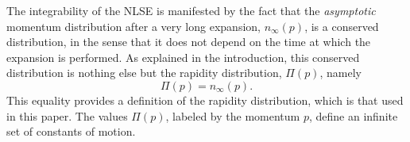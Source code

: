 \documentclass[submission,Phys,10pt]{SciPost}%
\begin{document}
The integrability of the NLSE is manifested
by the fact that the {\it asymptotic} momentum distribution after a very long expansion, $n_\infty(p)$, is a conserved distribution, in
the sense that it does not depend on the time at which the expansion is performed. As explained in the introduction, this conserved distribution is nothing else but the rapidity distribution,  $\Pi(p)$, namely
\begin{equation}
    \Pi(p)=n_\infty(p).
\end{equation}
This equality provides a definition of the rapidity distribution, which is that used in this paper.
The values $\Pi(p)$, labeled by the momentum $p$, define an infinite  set of constants of motion.
\end{document}
